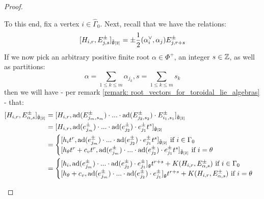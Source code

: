 \begin{proof}
\begin{itemize}
                    To this end, fix a vertex $i \in \hat{\Gamma}_0$. Next, recall that we have the relations:
                        $$[H_{i, r}, E_{j, s}^{\pm}]_{\tilde{\g}_{[2]}} = \pm \frac12 (\alpha_i^{\vee}, \alpha_j) E_{j, r + s}^{\pm}$$
                    If we now pick an arbitrary positive finite root $\alpha \in \Phi^+$, an integer $s \in \Z$, as well as partitions: 
                        $$\alpha = \sum_{1 \leq k \leq m} \alpha_{j_k}, s = \sum_{1 \leq k \leq m} s_k$$
                    then we will have - per remark \ref{remark: root_vectors_for_toroidal_lie_algebras} - that:
                        $$
                            \begin{aligned}
                                [H_{i, r}, E_{\alpha, s}^{\pm}]_{\tilde{\g}_{[2]}} & = [ H_{i, r}, \ad(E_{j_m, s_m}^{\pm}) \cdot ... \cdot \ad(E_{j_2, s_2}^{\pm}) \cdot E_{i_1, s_1}^{\pm} ]_{\tilde{\g}_{[2]}}
                                \\
                                & = [ H_{i, r}, \ad(e_{j_m}^{\pm}) \cdot ... \cdot \ad(e_{j_2}^{\pm}) \cdot e_{j_1}^{\pm} t^s ]_{\tilde{\g}_{[2]}}
                                \\
                                & = 
                                \begin{cases}
                                    \text{$[ h_i t^r, \ad(e_{j_m}^{\pm}) \cdot ... \cdot \ad(e_{j_2}^{\pm}) \cdot e_{j_1}^{\pm} t^s ]_{\tilde{\g}_{[2]}}$ if $i \in \Gamma_0$}
                                    \\
                                    \text{$[ h_{\theta} t^r + c_v t^r, \ad(e_{j_m}^{\pm}) \cdot ... \cdot \ad(e_{j_2}^{\pm}) \cdot e_{j_1}^{\pm} t^s ]_{\tilde{\g}_{[2]}}$ if $i = \theta$}
                                \end{cases}
                                \\
                                & = 
                                \begin{cases}
                                    \text{$[ h_i, \ad(e_{j_m}^{\pm}) \cdot ... \cdot \ad(e_{j_2}^{\pm}) \cdot e_{j_1}^{\pm} ]_{\g} t^{r + s} + K(H_{i, r}, E_{\alpha, s}^{\pm})$ if $i \in \Gamma_0$}
                                    \\
                                    \text{$[ h_{\theta} + c_v, \ad(e_{j_m}^{\pm}) \cdot ... \cdot \ad(e_{j_2}^{\pm}) \cdot e_{j_1}^{\pm} ]_{\g} t^{r + s} + K(H_{i, r}, E_{\alpha, s}^{\pm})$ if $i = \theta$}
                                \end{cases}

\end{aligned}$$
\end{itemize}
\end{proof}
